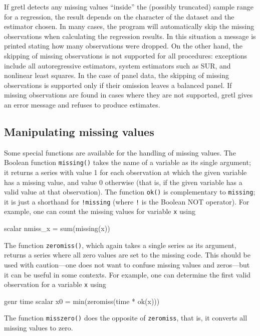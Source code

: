 If gretl detects any missing values ``inside'' the (possibly
truncated) sample range for a regression, the result depends on the
character of the dataset and the estimator chosen.  In many cases, the
program will automatically skip the missing observations when
calculating the regression results.  In this situation a message is
printed stating how many observations were dropped.  On the other
hand, the skipping of missing observations is not supported for all
procedures: exceptions include all autoregressive estimators, system
estimators such as SUR, and nonlinear least squares.  In the case of
panel data, the skipping of missing observations is supported only if
their omission leaves a balanced panel. If missing observations are
found in cases where they are not supported, gretl gives an
error message and refuses to produce estimates.

\subsection{Manipulating missing values}
\label{sec:genr-missing}

Some special functions are available for the handling of missing
values.  The Boolean function \verb+missing()+ takes the name of a
variable as its single argument; it returns a series with value 1 for
each observation at which the given variable has a missing value, and
value 0 otherwise (that is, if the given variable has a valid value at
that observation).  The function \verb+ok()+ is complementary to
\verb+missing+; it is just a shorthand for \verb+!missing+ (where
\verb+!+ is the Boolean NOT operator).  For example, one can count the
missing values for variable \verb+x+ using

\begin{code}
scalar nmiss_x = sum(missing(x))
\end{code}

The function \verb+zeromiss()+, which again takes a single series as
its argument, returns a series where all zero values are set to the
missing code.  This should be used with caution---one does not want to
confuse missing values and zeros---but it can be useful in some
contexts.  For example, one can determine the first valid observation
for a variable \verb+x+ using

\begin{code}
genr time
scalar x0 = min(zeromiss(time * ok(x)))
\end{code}

The function \verb+misszero()+ does the opposite of \verb+zeromiss+,
that is, it converts all missing values to zero.

